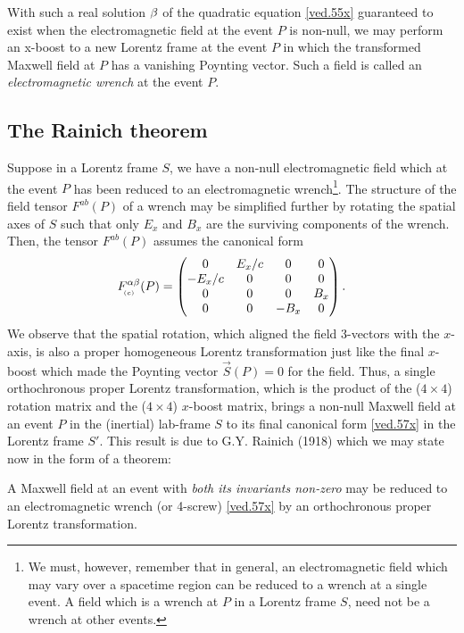 With such a real solution ${\beta}$ of the quadratic equation 
\eqref{ved.55x} guaranteed to exist when the 
electromagnetic 
field at the event $P$ is non-null, we may perform an 
x-boost to a new  Lorentz frame at the event $P$ in which 
the  transformed Maxwell field at $P$ has a vanishing 
Poynting vector. Such a field is called an 
\textsl{electromagnetic wrench} at the event $P$.

\subsection{The Rainich theorem}
Suppose  in a Lorentz frame $S$, we have a non-null  
electromagnetic field which at the event $P$ has been   
reduced to an electromagnetic wrench\footnote{We must, 
however, remember that in general, an electromagnetic field 
which may vary over a spacetime region can be reduced to a 
wrench at a single event. A field which is a  wrench at $P$ 
in a Lorentz frame $S$, need not be a  wrench at other 
events.}. The structure of the field tensor $F^{ab}(P)$ of 
a wrench may be simplified  further by rotating the 
spatial axes of $S$ such that only $E_x$ and $B_x$ are the 
surviving components of the wrench. Then, the tensor 
$F^{ab}(P)$ assumes the canonical form
\begin{align}\label{ved.57x}
F^{{\alpha}{\beta}}_{_{\hspace*{-1.5pt}{(c)}}}(P)=
\begin{pmatrix}
0 & E_x/c & 0&0 \\
-E_x/c  & 0 &  0& 0 \\
0 & 0 & 0 & B_x\\
0&0  & -B_x & 0
\end{pmatrix}.
\end{align}
We observe that the spatial rotation, which aligned the 
field 3-vectors with the $x$-axis, is also a proper  
homogeneous Lorentz transformation just like the final  
$x$-boost which made the Poynting vector $\vec{S}(P)=0$ for 
the field. Thus, a single orthochronous proper Lorentz 
transformation,  which is the product of the 
($4\times4$)  
rotation matrix and the ($4\times4$) $x$-boost matrix, 
brings a non-null Maxwell field at an event $P$ in the 
(inertial)  lab-frame $S$ to its final canonical form 
\eqref{ved.57x} in the Lorentz frame $S'$. This result is 
due to G.Y. Rainich (1918) which we may state now in the 
form of a theorem:

 A Maxwell field at an event with
\textsl{both its invariants non-zero} may be reduced to an
electromagnetic wrench (or 4-screw) \eqref{ved.57x} by 
an  orthochronous proper Lorentz transformation.

